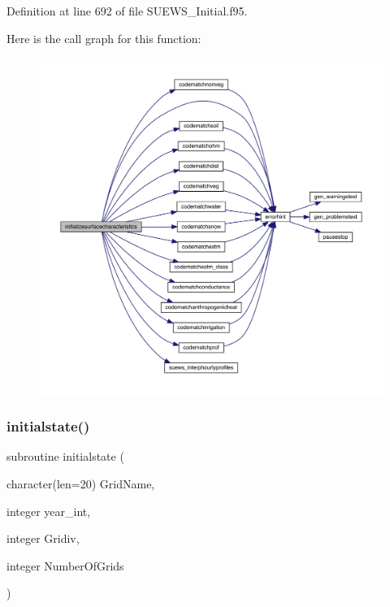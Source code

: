 Definition at line 692 of file S\+U\+E\+W\+S\+\_\+\+Initial.\+f95.

Here is the call graph for this function\+:\nopagebreak
\begin{figure}[H]
\begin{center}
\leavevmode
\includegraphics[width=350pt]{_s_u_e_w_s___initial_8f95_a60d2335c00fd453336ef8b8a74b907c7_cgraph}
\end{center}
\end{figure}
\mbox{\label{_s_u_e_w_s___initial_8f95_a9e4519818c5c3fcbefcdd1e02030275b}} 
\subsubsection{\texorpdfstring{initialstate()}{initialstate()}}
{\footnotesize\ttfamily subroutine initialstate (\begin{DoxyParamCaption}\item[{character(len=20)}]{Grid\+Name,  }\item[{integer}]{year\+\_\+int,  }\item[{integer}]{Gridiv,  }\item[{integer}]{Number\+Of\+Grids }\end{DoxyParamCaption})}




